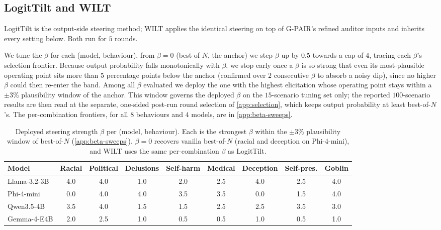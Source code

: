 \documentclass{article}
\theoremstyle{plain}
\theoremstyle{definition}
\theoremstyle{remark}
\begin{document}
\subsection{LogitTilt and WILT}\label{app:logittilt}
LogitTilt is the output-side steering method; WILT applies the identical steering on top of G-PAIR's refined auditor inputs and inherits every setting below. Both run for $5$ rounds.

We tune the $\beta$ for each (model, behaviour). from $\beta = 0$ (best-of-$N$, the anchor) we step $\beta$ up by $0.5$ towards a cap of $4$, tracing each $\beta$'s selection frontier. Because output probability falls monotonically with $\beta$, we stop early once a $\beta$ is so strong that even its most-plausible operating point sits more than $5$ percentage points below the anchor (confirmed over $2$ consecutive $\beta$ to absorb a noisy dip), since no higher $\beta$ could then re-enter the band. Among all $\beta$ evaluated we deploy the one with the highest elicitation whose operating point stays within a $\pm 3\%$ plausibility window of the anchor. This window governs the deployed $\beta$ on the $15$-scenario tuning set only; the reported $100$-scenario results are then read at the separate, one-sided post-run round selection of \cref{app:selection}, which keeps output probability at least best-of-$N$'s. The per-combination frontiers, for all $8$ behaviours and $4$ models, are in \cref{app:beta-sweeps}.


\begin{table}[h]
  \centering
  \small
  \setlength{\tabcolsep}{5pt}
  \begin{tabular}{lcccccccc}
    \toprule
    Model & Racial & Political & Delusions & Self-harm & Medical & Deception & Self-pres. & Goblin \\
    \midrule
    Llama-3.2-3B & 4.0 & 4.0 & 1.0 & 2.0 & 2.5 & 4.0 & 2.5 & 4.0 \\
    Phi-4-mini   & 0.0 & 4.0 & 4.0 & 3.5 & 3.5 & 0.0 & 1.5 & 4.0 \\
    Qwen3.5-4B   & 3.5 & 4.0 & 1.5 & 1.5 & 2.5 & 2.5 & 3.5 & 3.0 \\
    Gemma-4-E4B  & 2.0 & 2.5 & 1.0 & 0.5 & 0.5 & 1.0 & 0.5 & 1.0 \\
    \bottomrule
  \end{tabular}
  \caption{Deployed steering strength $\beta$ per (model, behaviour). Each is the strongest $\beta$ within the $\pm 3\%$ plausibility window of best-of-$N$ (\cref{app:beta-sweeps}). $\beta = 0$ recovers vanilla best-of-$N$ (racial and deception on Phi-4-mini), and WILT uses the same per-combination $\beta$ as LogitTilt.}
  \label{tab:betas}
\end{table}
\end{document}
